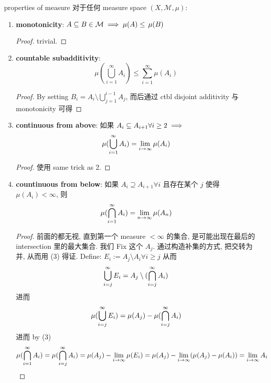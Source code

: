 \begin{theorem}{properties of measure}
    对于任何 measure space $(X,\mathcal{M}, \mu)$:
    \begin{enumerate}
        \item \textbf{monotonicity}: $A \subseteq B \in \mathcal{M} \implies \mu(A) \leq \,\mu(B)$
        \begin{proof}
            trivial.
        \end{proof}
        \item \textbf{countable subadditivity}: 
        $$
        \mu(\bigcup_{i=1}^\infty A_i) \leq \sum_{i=1}^\infty \mu(A_i)
        $$
        \begin{proof}
            By setting $B_i = A_i \setminus \bigcup_{j=1}^{i-1} A_j$, 而后通过 ctbl disjoint additivity 与 monotonicity 可得
        \end{proof}
        \item \textbf{continuous from above}: 
        如果 $A_i \subseteq A_{i+1} \forall i \geq 2\implies $
        $$
        \mu(\bigcup_{i=1}^{\infty}A_i   ) = \lim_{i \rightarrow \infty} \mu(A_i)
        $$
        \begin{proof}
            使用 same trick as 2.
        \end{proof}
        \item \textbf{countinuous from below}:
        如果 $A_i \supseteq A_{i+1} \forall i$ 且存在某个 $j$ 使得 $\mu(A_i) < \infty$, 则
        $$
        \mu(\bigcap_{i=1}^{\infty}A_i) = \lim_{n \rightarrow \infty} \mu(A_n)
        $$
        \begin{proof}
            前面的都无视, 直到第一个 measure $< \infty$ 的集合, 是可能出现在最后的 intersection 里的最大集合. 我们 Fix 这个 $A_j$. 通过构造补集的方式, 把交转为并, 从而用 (3) 得证.
            Define:
            $
            E_i := A_j \setminus A_i \forall i \geq j
            $
            从而
            $$
            \bigcup_{i=j}^\infty E_i = A_j \setminus (\bigcap_{i=j}^\infty A_i)
            $$进而 
            $$
            \mu( \bigcup_{i=j}^\infty E_i) = \mu(A_j) - \mu(\bigcap_{i=j}^\infty A_i)
            $$
            进而 by (3)
            $$
            \mu(\bigcap_{i=1}^\infty A_i) = \mu(\bigcap_{i=j}^\infty A_i) = \mu(A_j) - \lim_{i\rightarrow \infty}\mu(E_i)  = \mu(A_j) - \lim_{i\rightarrow \infty}(\mu(A_j) - \mu(A_i))
            = \lim_{i\rightarrow \infty} A_i
            $$
            
        \end{proof}
    \end{enumerate}
\end{theorem}
